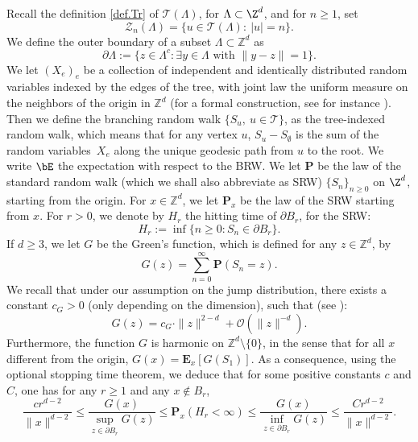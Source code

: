 Recall the definition \eqref{def.Tr} of $\mathcal T(\Lambda)$, for $\Lambda\subset
\Z^d$, and for $n\ge 1$, set
\begin{equation}\label{ZnLambda}
\mathcal Z_n(\Lambda)=\{u\in \mathcal T(\Lambda):\ |u|=n\}.
\end{equation}
We define the outer boundary of a subset $\Lambda\subset \mathbb Z^d$ as
\[
\partial \Lambda := \{ z \in \Lambda^c : \exists y\in \Lambda \text{ with }\|y-z\|= 1\}.
\]
We let $(X_e)_e$ be a collection of independent and identically distributed random variables indexed by the edges of the tree, with
joint law the uniform measure on the neighbors of the origin in $\mathbb Z^d$
(for a formal construction, see for instance \cite{Shi}). Then we define the branching random walk $\{S_u,\ u\in \mathbf {\mathcal T}\}$, as the tree-indexed random walk, which means that for
any vertex $u$, $S_u-S_\emptyset$ is the sum of the
random variables~$X_e$ along the unique geodesic path from $u$ to the root.
We write $\bE$ the expectation with respect to the BRW. We let
$\mathbf P$ be the law of the standard random walk (which we shall also abbreviate as SRW) $\{S_n\}_{n\ge 0}$ on $\Z^d$, starting from the origin.
For $x\in \mathbb Z^d$, we let $\mathbf P_x$ be the law of the SRW starting from $x$. For $r > 0$,
we denote by $H_r$ the hitting time
of $\partial B_r$, for the SRW:
\begin{equation}\label{Hr}
H_r:= \inf\{n \ge 0 : S_n \in \partial B_r\}.
\end{equation}
If $d\ge 3$, we let
$G$ be the Green's function, which is defined for any $z\in \mathbb Z^d$, by
\[
G(z) = \sum_{n=0}^\infty \mathbf P(S_n= z).
\]
We recall that under our assumption on the jump distribution, there exists a constant $c_G>0$ (only depending on the dimension), such that (see \cite[Th.\,4.3.1]{LL10}):
\begin{equation}\label{Green}
G(z) = c_G\cdot \|z\|^{2-d} + \mathcal O(\|z\|^{-d}).
\end{equation}
Furthermore, the function $G$ is harmonic on $\mathbb Z^d\setminus \{0\}$, in the sense that for all $x$ different from the origin,
$G(x) = \mathbf E_x[G(S_1)]$. As a consequence, using the optional stopping time theorem, we deduce that for some positive constants
$c$ and $C$, one has for any $r\ge 1$ and any $x\notin B_r$,
\begin{equation}\label{Green2}
\frac{cr^{d-2}}{\|x\|^{d-2}}\le \frac{G(x)}{\sup_{z\in \partial B_r} G(z)}
\le \mathbf P_x(H_r<\infty) \le \frac{G(x)}{\inf_{z\in \partial B_r} G(z)}
\le \frac{Cr^{d-2}}{\|x\|^{d-2}}.
\end{equation}

